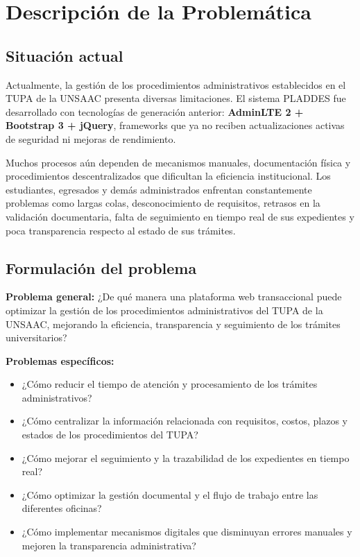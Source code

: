\section{Descripción de la Problemática}
 
\subsection{Situación actual}
 
Actualmente, la gestión de los procedimientos administrativos establecidos en el TUPA de la UNSAAC presenta diversas limitaciones. El sistema PLADDES fue desarrollado con tecnologías de generación anterior: \textbf{AdminLTE 2 + Bootstrap 3 + jQuery}, frameworks que ya no reciben actualizaciones activas de seguridad ni mejoras de rendimiento.
 
Muchos procesos aún dependen de mecanismos manuales, documentación física y procedimientos descentralizados que dificultan la eficiencia institucional. Los estudiantes, egresados y demás administrados enfrentan constantemente problemas como largas colas, desconocimiento de requisitos, retrasos en la validación documentaria, falta de seguimiento en tiempo real de sus expedientes y poca transparencia respecto al estado de sus trámites.
 
\subsection{Formulación del problema}
 
\textbf{Problema general:} ¿De qué manera una plataforma web transaccional puede optimizar la gestión de los procedimientos administrativos del TUPA de la UNSAAC, mejorando la eficiencia, transparencia y seguimiento de los trámites universitarios?
 
\textbf{Problemas específicos:}
\begin{itemize}
    \item ¿Cómo reducir el tiempo de atención y procesamiento de los trámites administrativos?
    \item ¿Cómo centralizar la información relacionada con requisitos, costos, plazos y estados de los procedimientos del TUPA?
    \item ¿Cómo mejorar el seguimiento y la trazabilidad de los expedientes en tiempo real?
    \item ¿Cómo optimizar la gestión documental y el flujo de trabajo entre las diferentes oficinas?
    \item ¿Cómo implementar mecanismos digitales que disminuyan errores manuales y mejoren la transparencia administrativa?
\end{itemize}
 
